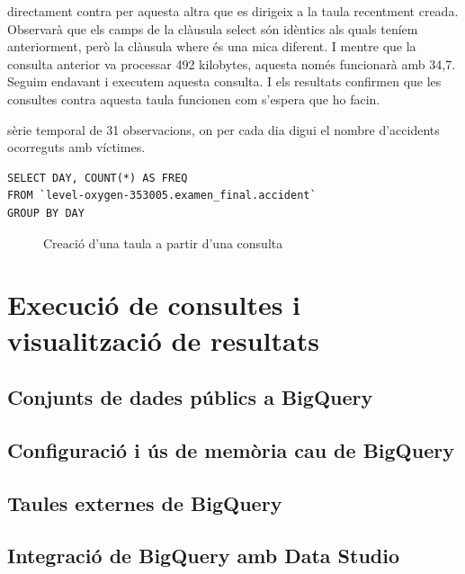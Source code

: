 \documentclass[12pt,longbibliography]{article}
\theoremstyle{definition}
\theoremstyle{remark}
\begin{document}
directament contra per aquesta altra que es dirigeix a la taula recentment creada. Observarà que els camps de la clàusula select són idèntics als quals teníem anteriorment, però la clàusula where és una mica diferent. I mentre que la consulta anterior va processar 492 kilobytes, aquesta només funcionarà amb 34,7. Seguim endavant i executem aquesta consulta. I els resultats confirmen que les consultes contra aquesta taula funcionen com s'espera que ho facin.

sèrie temporal de 31 observacions, on per cada dia digui el nombre d’accidents ocorreguts amb víctimes.

\begin{verbatim}
SELECT DAY, COUNT(*) AS FREQ
FROM `level-oxygen-353005.examen_final.accident`
GROUP BY DAY
\end{verbatim}

\vspace{2mm}
\begin{figure}[h!]
\par
{}%
\hfill
{}%
\par

\caption{Creació d'una taula a partir d'una consulta}
\label{fig:bq17}
\end{figure}
\vspace{2mm}


\newpage

\section{Execució de consultes i visualització de resultats}

\subsection{Conjunts de dades públics a BigQuery}

\subsection{Configuració i ús de memòria cau de BigQuery}

\subsection{Taules externes de BigQuery}

\subsection{Integració de BigQuery amb Data Studio}

\newpage

\listoffigures
\end{document}
